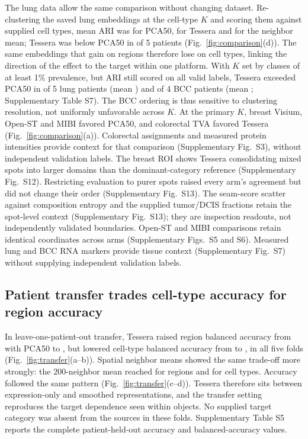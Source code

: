 \documentclass[11pt]{article}
\newcommand{\panelref}[2]{Fig.~\ref{#1}(#2)}
\begin{document}
The lung data allow the same comparison without changing dataset. Re-clustering the saved lung embeddings at the cell-type \(K\) and scoring them against supplied cell types, mean ARI was \CellTypePca{} for PCA50, \CellTypeTessera{} for Tessera and \CellTypeMean{} for the neighbor mean; Tessera was below PCA50 in \CellTypeTesseraLower{} of 5 patients (\panelref{fig:comparison}{d}). The same embeddings that gain on regions therefore lose on cell types, linking the direction of the effect to the target within one platform. With \(K\) set by classes of at least 1\% prevalence, but ARI still scored on all valid labels, Tessera exceeded PCA50 in \LungCommonKBetter{} of 5 lung patients (mean \LungCommonKDelta{}) and \BccCommonKBetter{} of 4 BCC patients (mean \BccCommonKDelta{}; Supplementary Table S7). The BCC ordering is thus sensitive to clustering resolution, not uniformly unfavorable across \(K\). At the primary \(K\), breast Visium, Open-ST and MIBI favored PCA50, and colorectal TVA favored Tessera (\panelref{fig:comparison}{a}). Colorectal assignments and measured protein intensities provide context for that comparison (Supplementary Fig.~S3), without independent validation labels. The breast ROI shows Tessera consolidating mixed spots into larger domains than the dominant-category reference (Supplementary Fig.~S12). Restricting evaluation to purer spots raised every arm's agreement but did not change their order (Supplementary Fig.~S13). The seam-score scatter against composition entropy and the supplied tumor/DCIS fractions retain the spot-level context (Supplementary Fig.~S13); they are inspection readouts, not independently validated boundaries. Open-ST and MIBI comparisons retain identical coordinates across arms (Supplementary Figs.~S5 and S6). Measured lung and BCC RNA markers provide tissue context (Supplementary Fig.~S7) without supplying independent validation labels.









\subsection{Patient transfer trades cell-type accuracy for region accuracy}
In leave-one-patient-out transfer, Tessera raised region balanced accuracy from \TransferRegionPca{} with PCA50 to \TransferRegionFull{}, but lowered cell-type balanced accuracy from \TransferCellPca{} to \TransferCellFull{}, in all five folds (\panelref{fig:transfer}{a--b}). Spatial neighbor means showed the same trade-off more strongly: the 200-neighbor mean reached \TransferRegionMeanTwoHundred{} for regions and \TransferCellMeanTwoHundred{} for cell types. Accuracy followed the same pattern (\panelref{fig:transfer}{c--d}). Tessera therefore sits between expression-only and smoothed representations, and the transfer setting reproduces the target dependence seen within objects. No supplied target category was absent from the sources in these folds. Supplementary Table S5 reports the complete patient-held-out accuracy and balanced-accuracy values.
\end{document}
